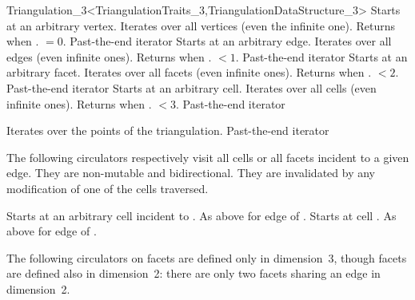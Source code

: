 \begin{ccRefClass}{Triangulation_3<TriangulationTraits_3,TriangulationDataStructure_3>}
{Starts at an arbitrary vertex. Iterates over all vertices (even the infinite
one). Returns  when
\ccVar. $=0$.}  
\ccGlue
{}
{Past-the-end iterator}
\ccGlue
{}
{Starts at an arbitrary edge. Iterates over all edges (even infinite
ones). Returns  when \ccVar. $<1$.}
\ccGlue
{}
{Past-the-end iterator}
\ccGlue
{}
{Starts at an arbitrary facet. Iterates over all facets (even infinite
ones). Returns  when 
\ccVar. $<2$.}
\ccGlue
{}
{Past-the-end iterator}
\ccGlue
{}
{Starts at an arbitrary cell. Iterates over all cells (even infinite
ones). Returns  when 
\ccVar. $<3$.}
\ccGlue
{}
{Past-the-end iterator}

{Iterates over the points of the triangulation.}
\ccGlue
{}
{Past-the-end iterator}


The following circulators respectively visit all cells or all facets
incident to a given edge. They are non-mutable and bidirectional. They
are invalidated by any modification of one of the cells traversed. 

{Starts at an arbitrary cell incident to .
}
\ccGlue
{}
{As above for edge  of .}
\ccGlue
{}
{Starts at cell .
}
\ccGlue
{}
{As above for edge  of .}

The following circulators on facets are defined only in dimension~3,
though facets are defined also in dimension~2: there are only two
facets sharing an edge in dimension~2. 


\end{ccRefClass}
